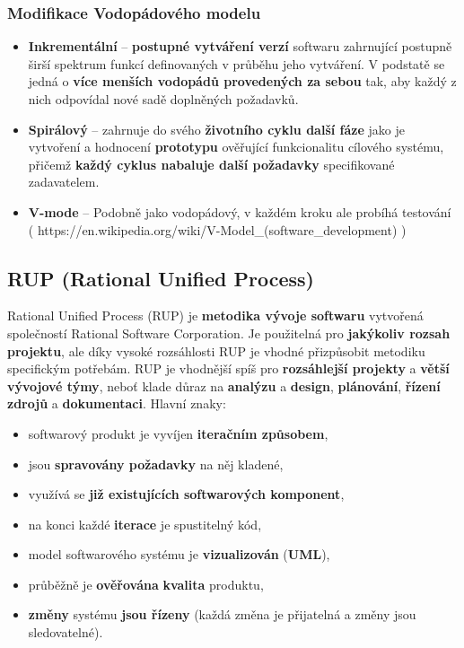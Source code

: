 \subsubsection{Modifikace Vodopádového modelu}
\begin{itemize}
\item \textbf{Inkrementální} -- \textbf{postupné vytváření verzí} softwaru zahrnující postupně širší spektrum funkcí definovaných v průběhu jeho vytváření. V podstatě se jedná o \textbf{více menších vodopádů provedených za sebou} tak, aby každý z nich odpovídal nové sadě doplněných požadavků.
\item \textbf{Spirálový} -- zahrnuje do svého \textbf{životního cyklu další fáze} jako je vytvoření a hodnocení \textbf{prototypu} ověřující funkcionalitu cílového systému, přičemž \textbf{každý cyklus nabaluje další požadavky} specifikované zadavatelem.
\item \textbf{V-mode} -- Podobně jako vodopádový, v každém kroku ale probíhá testování ( https://en.wikipedia.org/wiki/V-Model_(software_development) )
\end{itemize}


\subsection{RUP (Rational Unified Process)}
Rational Unified Process (RUP) je \textbf{metodika vývoje softwaru} vytvořená společností Rational Software Corporation. Je použitelná pro \textbf{jakýkoliv rozsah projektu}, ale díky vysoké rozsáhlosti RUP je vhodné přizpůsobit metodiku specifickým potřebám. RUP je vhodnější spíš pro \textbf{rozsáhlejší projekty} a \textbf{větší vývojové týmy}, neboť klade důraz na \textbf{analýzu} a \textbf{design}, \textbf{plánování}, \textbf{řízení zdrojů} a \textbf{dokumentaci}. Hlavní znaky:

\begin{itemize}
\item softwarový produkt je vyvíjen \textbf{iteračním způsobem},
\item jsou \textbf{spravovány požadavky} na něj kladené,
\item využívá se \textbf{již existujících softwarových komponent},
\item na konci každé \textbf{iterace} je spustitelný kód,
\item model softwarového systému je \textbf{vizualizován} (\textbf{UML}),
\item průběžně je \textbf{ověřována} \textbf{kvalita} produktu,
\item \textbf{změny} systému\textbf{ jsou řízeny} (každá změna je přijatelná a změny jsou sledovatelné).
\end{itemize}

